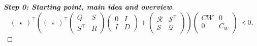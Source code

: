 \documentclass[11pt,a4paper,oneside,DIV=12,headings=small]{scrartcl}
\newcommand{\cS}{\mathcal{S}}
\newcommand{\cQ}{\mathcal{Q}}
\newcommand{\cR}{\mathcal{R}}
\theoremstyle{plain}
\begin{document}
\begin{proof}[\textbf{Step 0: \emph{Starting point, main idea and overview}}]
\begin{equation}
\begin{pmatrix} \star\end{pmatrix}^\top
\left(
\begin{pmatrix} \star \end{pmatrix}^\top 
\begin{pmatrix} Q & S \\ S^\top & R \end{pmatrix}
\begin{pmatrix} 0 & I \\ I & D \end{pmatrix}
+
\begin{pmatrix} \cR & \cS^\top \\ \cS & \cQ \end{pmatrix}
\right)
\begin{pmatrix}C W & 0 \\ 0 & C_W \end{pmatrix}\prec 0. 
\end{equation}


\end{proof}
\end{document}
